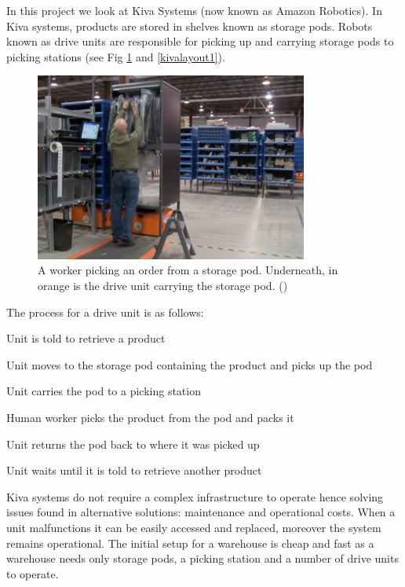 \documentclass[a4paper,11pt]{article}
\begin{document}
In this project we look at Kiva Systems (now known as Amazon Robotics). In Kiva systems, products are stored in shelves known as storage pods. Robots known as drive units are responsible for picking up and carrying storage pods to picking stations (see Fig \ref{kivaprocess} and \ref{kivalayout1}).
\begin{figure}[h!]
	\centering
	\includegraphics[width=0.8\textwidth ]{kivaprocess}
	\caption{A worker picking an order from a storage pod. Underneath, in orange is the drive unit carrying the storage pod. (\cite{kivayoutube2010quietlogistics})}
	\label{kivaprocess}
\end{figure}

\noindent The process for a drive unit is as follows:

\begin{compactenum}
	\item Unit is told to retrieve a product
	\item Unit moves to the storage pod containing the product and picks up the pod
	\item Unit carries the pod to a picking station
	\item Human worker picks the product from the pod and packs it
	\item Unit returns the pod back to where it was picked up
	\item Unit waits until it is told to retrieve another product
\end{compactenum}

\noindent Kiva systems do not require a complex infrastructure to operate hence solving issues found in alternative solutions: maintenance and operational costs. When a unit malfunctions it can be easily accessed and replaced, moreover the system remains operational. The initial setup for a warehouse is cheap and fast as a warehouse needs only storage pods, a picking station and a number of drive units to operate.
\end{document}
